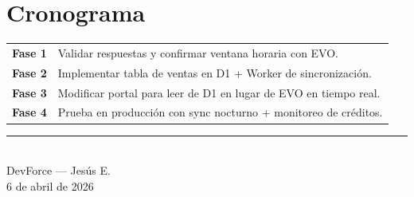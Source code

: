 \documentclass[11pt,a4paper]{article}
\begin{document}
\section*{Cronograma}

\begin{tabularx}{\textwidth}{lX}
  \textbf{Fase 1} & Validar respuestas y confirmar ventana horaria con EVO. \\[0.4em]
  \textbf{Fase 2} & Implementar tabla de ventas en D1 + Worker de sincronización. \\[0.4em]
  \textbf{Fase 3} & Modificar portal para leer de D1 en lugar de EVO en tiempo real. \\[0.4em]
  \textbf{Fase 4} & Prueba en producción con sync nocturno + monitoreo de créditos. \\
\end{tabularx}

\vfill

\begin{center}
  {\color{devgray}\rule{0.3\textwidth}{0.3pt}}\\[0.6cm]
  {\color{devgray}\small DevForce — Jesús E.}\\
  {\color{devgray}\small 6 de abril de 2026}
\end{center}
\end{document}
